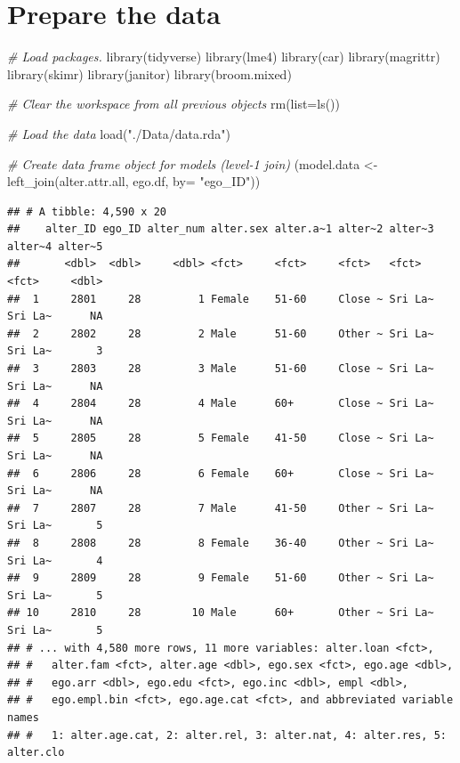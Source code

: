 \documentclass[
]{book}
\newenvironment{Shaded}{\begin{snugshade}}{\end{snugshade}}
\newcommand{\AttributeTok}[1]{\textcolor[rgb]{0.77,0.63,0.00}{#1}}
\newcommand{\CommentTok}[1]{\textcolor[rgb]{0.56,0.35,0.01}{\textit{#1}}}
\newcommand{\FunctionTok}[1]{\textcolor[rgb]{0.00,0.00,0.00}{#1}}
\newcommand{\NormalTok}[1]{#1}
\newcommand{\OtherTok}[1]{\textcolor[rgb]{0.56,0.35,0.01}{#1}}
\newcommand{\StringTok}[1]{\textcolor[rgb]{0.31,0.60,0.02}{#1}}
\begin{document}
\hypertarget{prepare-the-data}{%
\section{Prepare the data}\label{prepare-the-data}}

\begin{Shaded}
\begin{Highlighting}[]
\CommentTok{\# Load packages.}
\FunctionTok{library}\NormalTok{(tidyverse)}
\FunctionTok{library}\NormalTok{(lme4)}
\FunctionTok{library}\NormalTok{(car)}
\FunctionTok{library}\NormalTok{(magrittr)}
\FunctionTok{library}\NormalTok{(skimr)}
\FunctionTok{library}\NormalTok{(janitor)}
\FunctionTok{library}\NormalTok{(broom.mixed)}

\CommentTok{\# Clear the workspace from all previous objects}
\FunctionTok{rm}\NormalTok{(}\AttributeTok{list=}\FunctionTok{ls}\NormalTok{())}

\CommentTok{\# Load the data}
\FunctionTok{load}\NormalTok{(}\StringTok{"./Data/data.rda"}\NormalTok{)}

\CommentTok{\# Create data frame object for models (level{-}1 join)}
\NormalTok{(model.data }\OtherTok{\textless{}{-}} \FunctionTok{left\_join}\NormalTok{(alter.attr.all, ego.df, }\AttributeTok{by=} \StringTok{"ego\_ID"}\NormalTok{))}
\end{Highlighting}
\end{Shaded}

\begin{verbatim}
## # A tibble: 4,590 x 20
##    alter_ID ego_ID alter_num alter.sex alter.a~1 alter~2 alter~3 alter~4 alter~5
##       <dbl>  <dbl>     <dbl> <fct>     <fct>     <fct>   <fct>   <fct>     <dbl>
##  1     2801     28         1 Female    51-60     Close ~ Sri La~ Sri La~      NA
##  2     2802     28         2 Male      51-60     Other ~ Sri La~ Sri La~       3
##  3     2803     28         3 Male      51-60     Close ~ Sri La~ Sri La~      NA
##  4     2804     28         4 Male      60+       Close ~ Sri La~ Sri La~      NA
##  5     2805     28         5 Female    41-50     Close ~ Sri La~ Sri La~      NA
##  6     2806     28         6 Female    60+       Close ~ Sri La~ Sri La~      NA
##  7     2807     28         7 Male      41-50     Other ~ Sri La~ Sri La~       5
##  8     2808     28         8 Female    36-40     Other ~ Sri La~ Sri La~       4
##  9     2809     28         9 Female    51-60     Other ~ Sri La~ Sri La~       5
## 10     2810     28        10 Male      60+       Other ~ Sri La~ Sri La~       5
## # ... with 4,580 more rows, 11 more variables: alter.loan <fct>,
## #   alter.fam <fct>, alter.age <dbl>, ego.sex <fct>, ego.age <dbl>,
## #   ego.arr <dbl>, ego.edu <fct>, ego.inc <dbl>, empl <dbl>,
## #   ego.empl.bin <fct>, ego.age.cat <fct>, and abbreviated variable names
## #   1: alter.age.cat, 2: alter.rel, 3: alter.nat, 4: alter.res, 5: alter.clo
\end{verbatim}
\end{document}
